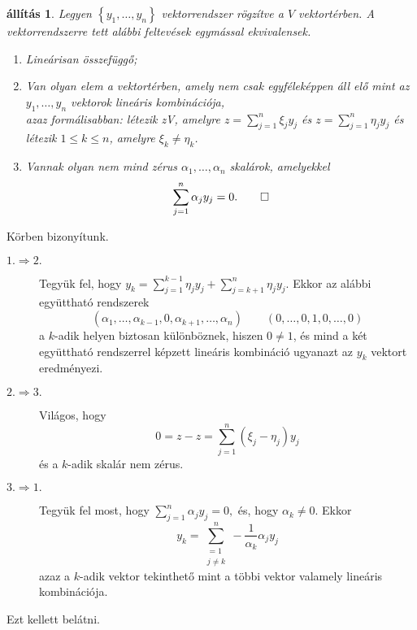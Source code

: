 \documentclass[9pt, showtrims]{memoir}
\makeatletter
\renewenvironment{proof}[1][\proofname]
    {\par\pushQED{\qed}%
    \normalfont \topsep6\p@\@plus6\p@\relax
    \trivlist
    \item[\hskip\labelsep
        \itshape
    #1\@addpunct{:}]\ignorespaces}
    {\popQED\endtrivlist\@endpefalse}
\theoremstyle{plain}
\newtheorem{proposition}{állítás}[section]
\theoremstyle{remark}
\theoremstyle{definition}
\makeatother
\begin{document}
\begin{proposition}
    Legyen $\left\{ y_1,\dots,y_n \right\}$ vektorrendszer rögzítve a $V$ vektortérben.
    A vektorrendszerre tett alábbi feltevések egymással ekvivalensek.
    \begin{enumerate}
        \item Lineárisan összefüggő;
        \item Van olyan elem a vektortérben, amely nem csak egyféleképpen áll elő mint az $y_1,\dots,y_n$
            vektorok lineáris kombinációja,\\
            azaz formálisabban:
            létezik z\in V, amelyre $z=\sum_{j=1}^n\xi_jy_j$ és $z=\sum_{j=1}^n\eta_jy_j$
            és létezik $1\leq k\leq n$, amelyre $\xi_k\neq\eta_k$.
        \item Vannak olyan nem mind zérus $\alpha_1,\dots,\alpha_n$ skalárok, amelyekkel
            \[
                \sum_{j=1}^n\alpha_jy_j=0.\qedhere
            \]
    \end{enumerate}
\end{proposition}
\begin{proof}
    Körben bizonyítunk.
    \begin{description}
        \item[$1.\Rightarrow 2.$] 
            Tegyük fel, hogy $y_k=\sum_{j=1}^{k-1}\eta_jy_j+\sum_{j=k+1}^n\eta_jy_j$.
            Ekkor az alábbi együttható rendszerek
            \[
                \left( \alpha_1,\dots,\alpha_{k-1},0,\alpha_{k+1},\dots,\alpha_n \right)
                \qquad
                \left( 0,\dots,0,1,0,\dots,0 \right)
            \]
            a $k$-adik helyen biztosan különböznek, 
            hiszen $0\neq 1$, 
            és mind a két együttható rendszerrel képzett lineáris kombináció ugyanazt az $y_k$ vektort eredményezi.
        \item[$2.\Rightarrow 3.$]
            Világos, hogy 
            \[
                0=z-z=
                \sum_{j=1}^n\left( \xi_j-\eta_j \right)y_j
            \]
            és a $k$-adik skalár nem zérus.
        \item[$3.\Rightarrow 1.$]
            Tegyük fel most, hogy 
            \(
            \sum_{j=1}^n\alpha_jy_j=0,
            \)
            és, hogy $\alpha_k\neq 0.$
            Ekkor 
            \[
                y_k=\sum_{\substack{=1\\j\neq k}}^n-\frac{1}{\alpha_k}\alpha_jy_j
            \]
            azaz a $k$-adik vektor tekinthető mint a többi vektor valamely lineáris kombinációja.
    \end{description}
    Ezt kellett belátni. 
\end{proof}
\end{document}
